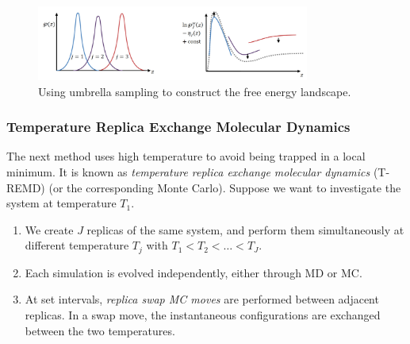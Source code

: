 \documentclass{article}
\theoremstyle{plain}\theoremheaderfont{\normalfont\itshape}\theorembodyfont{\rmfamily}\theoremseparator{.}\newtheorem*{rem}{Remark}\newtheorem*{ex}{Example}\newtheorem*{proof}{Proof}\newtheorem*{altp}{Alternative proof}
\theoremstyle{plain}\theoremheaderfont{\normalfont\bfseries}\theorembodyfont{\rmfamily}\theoremseparator{.}\newtheorem{thm}{Theorem}[section]\newtheorem{lem}[thm]{Lemma}\newtheorem{prop}[thm]{Proposition}\newtheorem*{cor}{Corollary}\newtheorem{defn}[thm]{Definition}\newtheorem{clm}[thm]{Claim}\newtheorem{clminproof}{Claim}\newtheorem{alg}[thm]{Algorithm}\newtheorem{hyp}[thm]{Hypothesis}\newtheorem{law}[thm]{Law}
\theoremstyle{break}\theoremheaderfont{\normalfont\itshape}\theorembodyfont{\rmfamily}\theoremseparator{.\medskip}\newtheorem*{proofskip}{Proof}\newtheorem*{exs}{Examples}\newtheorem*{rems}{Remarks}
\theoremstyle{break}\theoremheaderfont{\normalfont\bfseries}\theorembodyfont{\rmfamily}\theoremseparator{.\medskip}\newtheorem{lemskip}[thm]{Lemma}\newtheorem{defnskip}[thm]{Definition}\newtheorem{propskip}[thm]{Proposition}\newtheorem{thmskip}[thm]{Theorem}
\numberwithin{equation}{section}
\begin{document}
    \begin{figure}
        \centering
        \includegraphics[width=0.8\textwidth]{Umbrella.jpg}
        \caption{Using umbrella sampling to construct the free energy landscape.}
    \end{figure}

    \subsubsection{Temperature Replica Exchange Molecular Dynamics}
    The next method uses high temperature to avoid being trapped in a local minimum. It is known as \textit{temperature replica exchange molecular dynamics} (T-REMD) (or the corresponding Monte Carlo). Suppose we want to investigate the system at temperature \(T_1\).
    \begin{enumerate}[topsep=0pt]
        \item We create \(J\) replicas of the same system, and perform them simultaneously at different temperature \(T_j\) with \(T_1<T_2<\dots<T_J\).
        \item Each simulation is evolved independently, either through MD or MC.
        \item At set intervals, \textit{replica swap MC moves} are performed between adjacent replicas. In a swap move, the instantaneous configurations are exchanged between the two temperatures.
    \end{enumerate}
    
\end{document}
